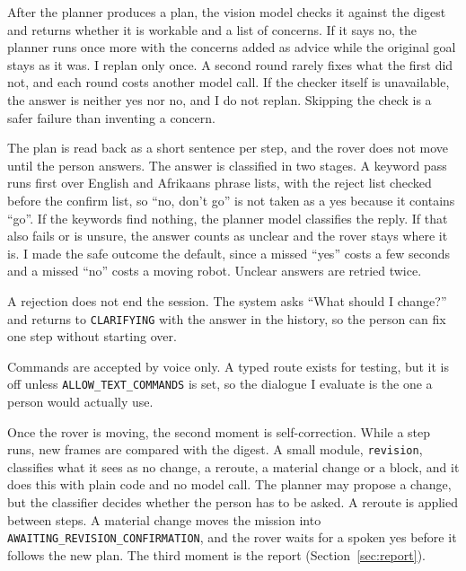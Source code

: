 \label{ssec:plancheck}

After the planner produces a plan, the vision model checks it against the digest
and returns whether it is workable and a list of concerns. If it says no, the
planner runs once more with the concerns added as advice while the original goal
stays as it was. I replan only once. A second round rarely fixes what the first
did not, and each round costs another model call. If the checker itself is
unavailable, the answer is neither yes nor no, and I do not replan. Skipping the
check is a safer failure than inventing a concern.

\label{ssec:confirmation}

The plan is read back as a short sentence per step, and the rover does not move
until the person answers. The answer is classified in two stages. A keyword pass
runs first over English and Afrikaans phrase lists, with the reject list checked
before the confirm list, so ``no, don't go'' is not taken as a yes because it
contains ``go''. If the keywords find nothing, the planner model classifies the
reply. If that also fails or is unsure, the answer counts as unclear and the rover
stays where it is. I made the safe outcome the default, since a missed ``yes''
costs a few seconds and a missed ``no'' costs a moving robot. Unclear answers are
retried twice.

A rejection does not end the session. The system asks ``What should I change?''
and returns to \texttt{CLARIFYING} with the answer in the history, so the person
can fix one step without starting over.

Commands are accepted by voice only. A typed route exists for testing, but it is
off unless \texttt{ALLOW\_TEXT\_COMMANDS} is set, so the dialogue I evaluate is
the one a person would actually use.

\label{ssec:revision}

Once the rover is moving, the second moment is self-correction. While a step
runs, new frames are compared with the digest. A small module, \texttt{revision},
classifies what it sees as no change, a reroute, a material change or a block,
and it does this with plain code and no model call. The planner may propose a
change, but the classifier decides whether the person has to be asked. A reroute
is applied between steps. A material change moves the mission into
\texttt{AWAITING\_REVISION\_CONFIRMATION}, and the rover waits for a spoken yes
before it follows the new plan. The third moment is the report
(Section~\ref{sec:report}).

